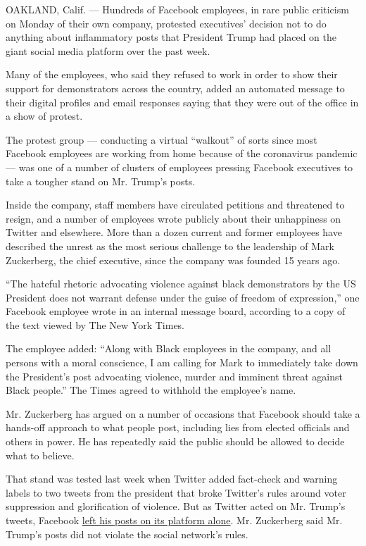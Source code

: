 OAKLAND, Calif. --- Hundreds of Facebook employees, in rare public
criticism on Monday of their own company, protested executives' decision
not to do anything about inflammatory posts that President Trump had
placed on the giant social media platform over the past week.

Many of the employees, who said they refused to work in order to show
their support for demonstrators across the country, added an automated
message to their digital profiles and email responses saying that they
were out of the office in a show of protest.

The protest group --- conducting a virtual ``walkout'' of sorts since
most Facebook employees are working from home because of the coronavirus
pandemic --- was one of a number of clusters of employees pressing
Facebook executives to take a tougher stand on Mr. Trump's posts.

Inside the company, staff members have circulated petitions and
threatened to resign, and a number of employees wrote publicly about
their unhappiness on Twitter and elsewhere. More than a dozen current
and former employees have described the unrest as the most serious
challenge to the leadership of Mark Zuckerberg, the chief executive,
since the company was founded 15 years ago.

``The hateful rhetoric advocating violence against black demonstrators
by the US President does not warrant defense under the guise of freedom
of expression,'' one Facebook employee wrote in an internal message
board, according to a copy of the text viewed by The New York Times.

The employee added: ``Along with Black employees in the company, and all
persons with a moral conscience, I am calling for Mark to immediately
take down the President's post advocating violence, murder and imminent
threat against Black people.'' The Times agreed to withhold the
employee's name.

Mr. Zuckerberg has argued on a number of occasions that Facebook should
take a hands-off approach to what people post, including lies from
elected officials and others in power. He has repeatedly said the public
should be allowed to decide what to believe.

That stand was tested last week when Twitter added fact-check and
warning labels to two tweets from the president that broke Twitter's
rules around voter suppression and glorification of violence. But as
Twitter acted on Mr. Trump's tweets, Facebook
\href{https://www.nytimes.com/2020/05/29/technology/twitter-facebook-zuckerberg-trump.html}{left
his posts on its platform alone}. Mr. Zuckerberg said Mr. Trump's posts
did not violate the social network's rules.

